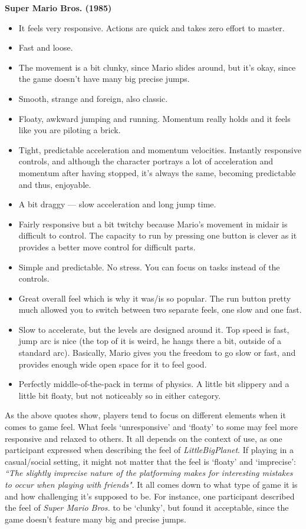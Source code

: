 \textbf{Super Mario Bros. (1985)}
\vspace{-5mm}
\begin{itemize}[noitemsep,nolistsep]
\item It feels very responsive. Actions are quick and takes zero effort to master.
\item Fast and loose.
\item The movement is a bit clunky, since Mario slides around, but it's okay, since the game doesn't have many big precise jumps.
\item Smooth, strange and foreign, also classic.
\item Floaty, awkward jumping and running. Momentum really holds and it feels like you are piloting a brick.
\item Tight, predictable acceleration and momentum velocities. Instantly responsive controls, and although the character portrays a lot of acceleration and momentum after having stopped, it's always the same, becoming predictable and thus, enjoyable.
\item A bit draggy --- slow acceleration and long jump time.
\item Fairly responsive but a bit twitchy because Mario's movement in midair is difficult to control. The capacity to run by pressing one button is clever as it provides a better move control for difficult parts.
\item Simple and predictable. No stress. You can focus on tasks instead of the controls.
\item Great overall feel which is why it was/is so popular. The run button pretty much allowed you to switch between two separate feels, one slow and one fast.
\item Slow to accelerate, but the levels are designed around it. Top speed is fast, jump arc is nice (the top of it is weird, he hangs there a bit, outside of a standard arc). Basically, Mario gives you the freedom to go slow or fast, and provides enough wide open space for it to feel good.
\item Perfectly middle-of-the-pack in terms of physics. A little bit slippery and a little bit floaty, but not noticeably so in either category.
\end{itemize}

As the above quotes show, players tend to focus on different elements when it comes to game feel. What feels `unresponsive' and `floaty' to some may feel more responsive and relaxed to others. It all depends on the context of use, as one participant expressed when describing the feel of \textit{LittleBigPlanet}. If playing in a casual/social setting, it might not matter that the feel is `floaty' and `imprecise': \textit{``The slightly imprecise nature of the platforming makes for interesting mistakes to occur when playing with friends"}. It all comes down to what type of game it is and how challenging it's supposed to be. For instance, one participant described the feel of \textit{Super Mario Bros.} to be `clunky', but found it acceptable, since the game doesn't feature many big and precise jumps.


